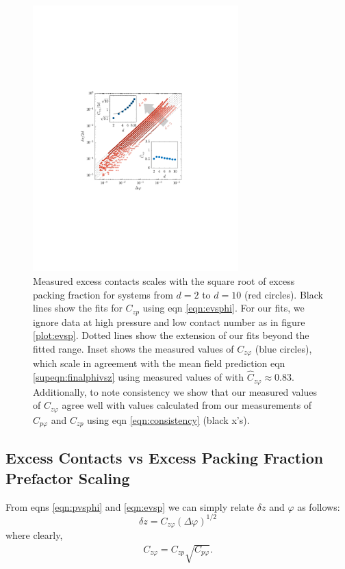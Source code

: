 \begin{figure}[th!]
\includegraphics[width=300px, trim=143 240 168 250, clip]{excessContactsScaling/evsphi.pdf}

\caption{Measured excess contacts scales with the square root of excess packing fraction for systems from $d=2$ to $d=10$ (red circles). Black lines show the fits for $C_{zp}$ using eqn \ref{eqn:evsphi}. For our fits, we ignore data at high pressure and low contact number as in figure \ref{plot:evsp}.
Dotted lines show the extension of our fits beyond the fitted range. Inset shows the measured values of $C_{z\varphi}$ (blue circles), which scale in agreement with the mean field prediction eqn \ref{supeqn:finalphivsz} using measured values of with $\hat{C}_{z\varphi} \approx 0.83$. Additionally, to note consistency we show that our measured values of $C_{z\varphi}$ agree well with values calculated from our measurements of $C_{p\varphi}$ and $C_{zp}$ using eqn \ref{eqn:consistency} (black x's).}

\label{plot:evsphi}
\end{figure}
%
\subsection{Excess Contacts vs Excess Packing Fraction Prefactor Scaling}

From eqns \ref{eqn:pvsphi} and \ref{eqn:evsp} 
we can simply relate $\delta z$ and $\varphi$ as follows:
%
\begin{equation}
\delta z=C_{z\varphi}\left(\Delta\varphi\right)^{1/2} \label{eqn:evsphi}
\end{equation}
%
where clearly, 
\begin{align}
C_{z\varphi}=C_{zp}\sqrt{C_{p\varphi}}. \label{eqn:consistency}
\end{align}

